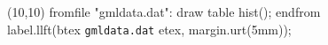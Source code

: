 \documentclass[12pt]{article}
\begin{document}
\begin{gmlfile}
\begin{figure}
\begin{gmlgraph}(10,10)
fromfile "gmldata.dat": draw table hist(); endfrom
label.llft(btex \texttt{gmldata.dat} etex, margin.urt(5mm));
\end{gmlgraph}
\end{figure}
\end{gmlfile}
\end{document}
